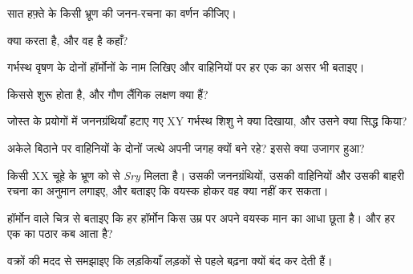 \begin{exercise}[$\star$]\label{exo:g11:becoming-male-female:2}
सात हफ़्ते के किसी भ्रूण की जनन-रचना का वर्णन कीजिए।
\end{exercise}

\begin{exercise}[$\star$]\label{exo:g11:becoming-male-female:3}
 क्या करता है, और वह है कहाँ?
\end{exercise}

\begin{exercise}[$\star$]\label{exo:g11:becoming-male-female:4}
गर्भस्थ वृषण के दोनों हॉर्मोनों के नाम लिखिए और वाहिनियों पर हर एक का असर
भी बताइए।
\end{exercise}

\begin{exercise}[$\star$]\label{exo:g11:becoming-male-female:5}
 किससे शुरू होता है, और गौण लैंगिक लक्षण क्या हैं?
\end{exercise}

\begin{exercise}[$\star\star$]\label{exo:g11:becoming-male-female:6}
जोस्त के प्रयोगों में जननग्रंथियाँ हटाए गए XY गर्भस्थ शिशु ने क्या दिखाया,
और उसने क्या सिद्ध किया?
\end{exercise}

\begin{exercise}[$\star\star$]\label{exo:g11:becoming-male-female:7}
अकेले  बिठाने पर वाहिनियों के दोनों जत्थे अपनी जगह क्यों बने
रहे? इससे क्या उजागर हुआ?
\end{exercise}

\begin{exercise}[$\star\star$]\label{exo:g11:becoming-male-female:8}
किसी XX चूहे के भ्रूण को  से \emph{Sry}  मिलता है। उसकी
जननग्रंथियों, उसकी वाहिनियों और उसकी बाहरी रचना का अनुमान लगाइए, और बताइए
कि वयस्क होकर वह क्या नहीं कर सकता।
\end{exercise}

\begin{exercise}[$\star\star$]\label{exo:g11:becoming-male-female:9}
हॉर्मोन वाले चित्र से बताइए कि हर हॉर्मोन किस उम्र पर अपने वयस्क मान का
आधा छूता है। और हर एक का पठार कब आता है?
\end{exercise}

\begin{exercise}[$\star\star$]\label{exo:g11:becoming-male-female:10}
वक्रों की मदद से समझाइए कि लड़कियाँ लड़कों से पहले बढ़ना क्यों बंद कर देती हैं।
\end{exercise}

